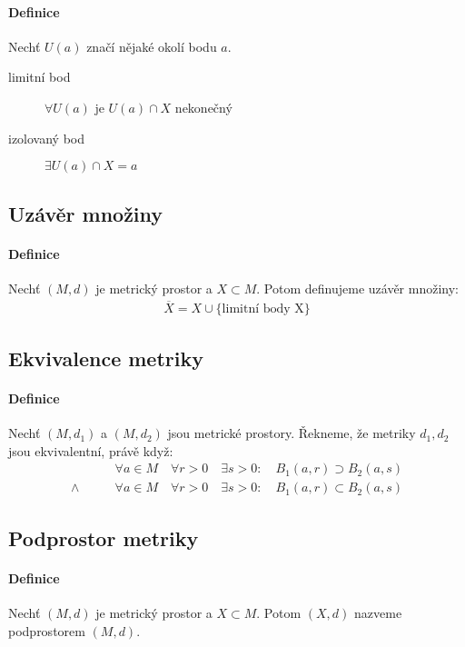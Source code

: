 \documentclass[a4paper,10pt]{article}
\begin{document}
\paragraph{Definice} 
Nechť $U(a)$ značí nějaké okolí bodu $a$.
\begin{description}
	\item[limitní bod] $\forall U(a)$ je $U(a) \cap X$ nekonečný
	\item[izolovaný bod] $\exists U(a) \cap X = a$
\end{description}



\subsection{Uzávěr množiny}
\setcounter{equation}{0}
\paragraph{Definice}
Nechť $(M,d)$ je metrický prostor a $X \subset M$. Potom definujeme uzávěr
množiny:
\begin{align*}
	\overline{X} = X \cup \{ \text{limitní body X} \}
\end{align*}


\subsection{Ekvivalence metriky}
\setcounter{equation}{0}
\paragraph{Definice}
Nechť $(M, d_1)$ a $(M, d_2)$ jsou metrické prostory. Řekneme, že metriky $d_1,
d_2$ jsou ekvivalentní, právě když:
\begin{align*}
	&\forall a \in M \quad \forall r > 0 \quad \exists s > 0: \quad B_1(a,r)
	\supset B_2(a,s) \\
	\land \qquad &\forall a \in M \quad \forall r > 0 \quad \exists s > 0: \quad B_1(a,r)
	\subset B_2(a,s)
\end{align*}

\subsection{Podprostor metriky}
\setcounter{equation}{0}
\paragraph{Definice}
Nechť $(M, d)$ je metrický prostor a $X \subset M$. Potom $(X,d)$ nazveme
podprostorem $(M, d)$.
\end{document}
